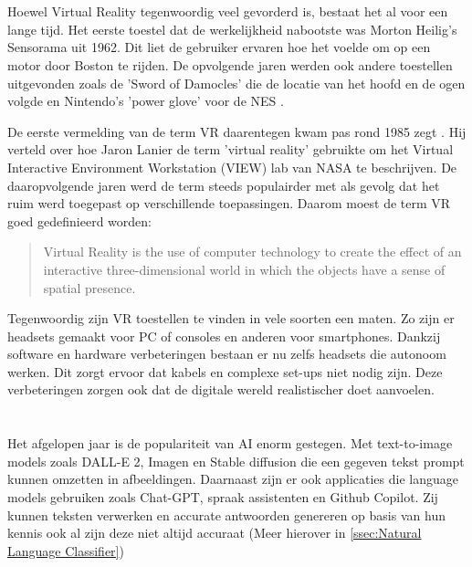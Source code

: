 \section{}%
Hoewel Virtual Reality tegenwoordig veel gevorderd is, bestaat het al voor een lange tijd. Het eerste toestel dat de werkelijkheid nabootste was Morton Heilig’s Sensorama uit 1962. Dit liet de gebruiker ervaren hoe het voelde om op een motor door Boston te rijden. De opvolgende jaren werden ook andere toestellen uitgevonden zoals de 'Sword of Damocles' die de locatie van het hoofd en de ogen volgde en Nintendo's 'power glove' voor de NES \autocite{Boas2012}.

De eerste vermelding van de term VR daarentegen kwam pas rond 1985 zegt \textcite{Bryson2013}. Hij verteld over hoe Jaron Lanier de term 'virtual reality' gebruikte om het Virtual Interactive Environment Workstation (VIEW) lab van NASA te beschrijven. De daaropvolgende jaren werd de term steeds populairder met als gevolg dat het ruim werd toegepast op verschillende toepassingen. Daarom moest de term VR goed gedefinieerd worden:

\begin{quote}
    Virtual Reality is the use of computer technology to create the effect of an
    interactive three-dimensional world in which the objects have a sense of spatial
    presence. \autocite{Bryson2013}
\end{quote}

Tegenwoordig zijn VR toestellen te vinden in vele soorten een maten. Zo zijn er headsets gemaakt voor PC of consoles en anderen voor smartphones. Dankzij software en hardware verbeteringen bestaan er nu zelfs headsets die autonoom werken. Dit zorgt ervoor dat kabels en complexe set-ups niet nodig zijn. Deze verbeteringen zorgen ook dat de digitale wereld realistischer doet aanvoelen.

\section{}%
Het afgelopen jaar is de populariteit van AI enorm gestegen. Met text-to-image models zoals DALL-E 2, Imagen en Stable diffusion die een gegeven tekst prompt kunnen omzetten in afbeeldingen. Daarnaast zijn er ook applicaties die language models gebruiken zoals Chat-GPT, spraak assistenten en Github Copilot. Zij kunnen teksten verwerken en accurate antwoorden genereren op basis van hun kennis ook al zijn deze niet altijd accuraat (Meer hierover in \ref{ssec:Natural Language Classifier})

